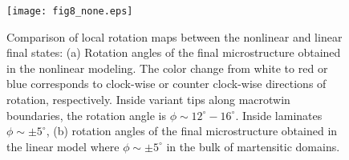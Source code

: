 \documentclass[twocolumn,amsmath,amssymb]{revtex4}
\begin{document}
%
\begin{figure}
\texttt{[image: fig8\_none.eps]}\hspace{0mm}
\hspace{0.00cm}
\caption{\label{rotmap} Comparison of local rotation maps between the nonlinear and linear final states: (a) Rotation angles of the final microstructure obtained in the nonlinear modeling. The color change from white to red or blue  corresponds to clock-wise or counter clock-wise directions of rotation, respectively.  Inside variant tips along macrotwin boundaries, the rotation angle is $\phi\sim12^\circ-16^\circ$. Inside laminates $\phi \sim\pm5^\circ$, (b) rotation angles of the final microstructure obtained in the linear model where $\phi \sim\pm5^\circ$ in the bulk  of martensitic domains.}
\end{figure}
%
\end{document}
